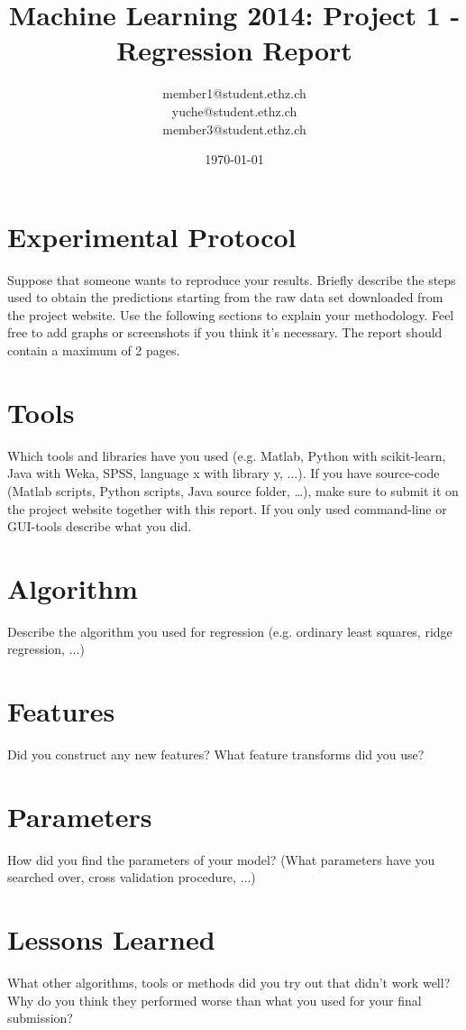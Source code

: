 \documentclass[a4paper, 11pt]{article}
\title{Machine Learning 2014: Project 1 - Regression Report}
\author{member1@student.ethz.ch\\ yuche@student.ethz.ch\\ member3@student.ethz.ch\\}
\date{\today}
\begin{document}
\maketitle

\section*{Experimental Protocol}
Suppose that someone wants to reproduce your results. Briefly describe the steps used to obtain the
predictions starting from the raw data set downloaded from the project website. Use the following
sections to explain your methodology. Feel free to add graphs or screenshots if you think it's
necessary. The report should contain a maximum of 2 pages.

\section{Tools}
Which tools and libraries have you used (e.g. Matlab, Python with scikit-learn, Java with Weka,
SPSS, language x with library y, $\ldots$). If you have source-code (Matlab scripts, Python scripts, Java source folder, \dots),
make sure to submit it on the project website together with this report. If you only used
command-line or GUI-tools describe what you did.

\section{Algorithm}
Describe the algorithm you used for regression (e.g. ordinary least squares, ridge regression, $\ldots$)

\section{Features}
Did you construct any new features? What feature transforms did you use?

\section{Parameters}
How did you find the parameters of your model? (What parameters have you searched over, cross validation procedure, $\ldots$)

\section{Lessons Learned} What other algorithms, tools or methods did you try out that didn't work well?
Why do you think they performed worse than what you used for your final submission?
\end{document}
